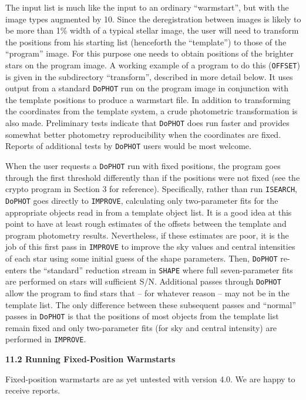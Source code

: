 The input list is much like the input to an ordinary
``warmstart'', but with the image types augmented by 10.
Since the deregistration between images is likely to be more
than 1\% width of a typical stellar image, the user will need
to transform the positions from his starting list
(henceforth the ``template'') to those of the ``program''
image.  For this purpose one needs to obtain positions of
the brighter stars on the program image.  A working example
of a program to do this ({\tt OFFSET}) is given in the subdirectory
``transform'', described in more detail below.
It uses output from a standard {\tt DoPHOT} run on
the program image in conjunction with the template positions
to produce a warmstart file.  In addition to transforming
the coordinates from the template system, a crude
photometric transformation is also made.  
Preliminary tests indicate that {\tt DoPHOT} does run faster and provides
somewhat better photometry reproducibility when the coordinates
are fixed.  Reports of additional tests by {\tt DoPHOT} users would be 
most welcome.

When the user requests a {\tt DoPHOT} run with fixed positions, the program
goes through the first threshold differently than if the positions
were not fixed (see the crypto program in Section 3 for reference).  
Specifically, rather than run {\tt ISEARCH}, {\tt DoPHOT} goes directly to 
{\tt IMPROVE}, calculating only two-parameter fits for the appropriate objects
read in from a template object list.  It is a good idea at this point
to have at least rough estimates of the offsets between
the template and program photometry results.  Nevertheless, if these
estimates are poor, it is the job of this first pass in {\tt IMPROVE} to
improve the sky values and central intensities of
each star using some initial guess of the shape parameters.  
Then, {\tt DoPHOT}
re-enters the ``standard'' reduction stream in {\tt SHAPE} where full
seven-parameter fits are performed on stars will sufficient S/N.  
Additional passes through {\tt DoPHOT} allow the program to find stars that
-- for whatever reason -- may not be in the template list.  The only 
difference between these subsequent passes and ``normal'' passes in
{\tt DoPHOT} is that the positions of most objects from the template
list remain fixed and only two-parameter fits (for sky and central 
intensity) are performed in {\tt IMPROVE}.

\centerline{\bf 11.2 Running Fixed-Position Warmstarts}

Fixed-position warmstarts are as yet untested with version 4.0.  
We are happy to receive reports.

